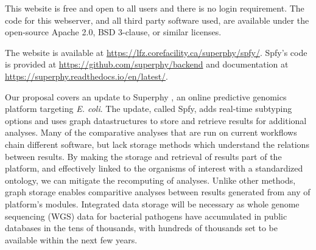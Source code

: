 \documentclass{article}
\begin{document}
This website is free and open to all users and there is no login requirement. The code for this webserver, and all third party software used, are available under the open-source Apache 2.0, BSD 3-clause, or similar licenses.

The website is available at \url{https://lfz.corefacility.ca/superphy/spfy/}. Spfy's code is provided at \url{https://github.com/superphy/backend} and documentation at \url{https://superphy.readthedocs.io/en/latest/}.

Our proposal covers an update to Superphy \cite{whiteside2016superphy}, an online predictive genomics platform targeting \textit{E. coli}.
The update, called Spfy, adds real-time subtyping options and uses graph datastructures to store and retrieve results for additional analyses.
Many of the comparative analyses that are run on current workflows chain different software, but lack storage methods which understand the relations between results.
By making the storage and retrieval of results part of the platform, and effectively linked to the organisms of interest with a standardized ontology, we can mitigate the recomputing of analyses. Unlike other methods, graph storage enables comparitive analyses between results generated from any of platform's modules.
Integrated data storage will be necessary as whole genome sequencing (WGS) data for bacterial pathogens have accumulated in public databases in the tens of thousands, with hundreds of thousands set to be available within the next few years.
\end{document}
